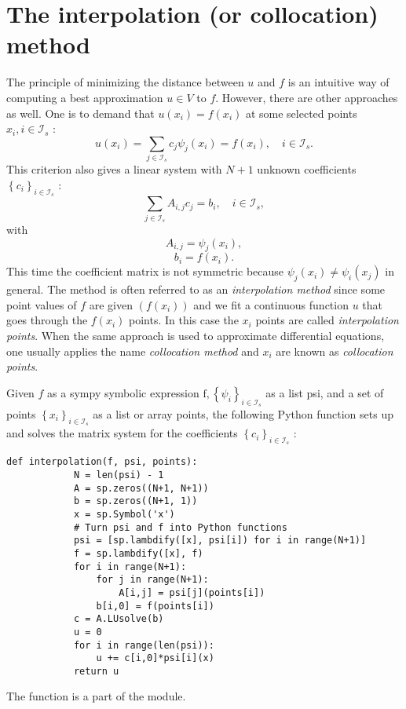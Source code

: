 \documentclass[../main.tex]{subfiles}
\begin{document}
	\section[The interpolation (or collocation) method]{The interpolation (or collocation) method}
	\label{sec:sec_2_10}
	The principle of minimizing the distance between $u$ and $f$ is an intuitive way of computing a best approximation $u \in V$ to $f$. However, there are other approaches as well. One is to demand that $u\left(x_{i}\right)=f\left(x_{i}\right)$ at some selected points $x_{i}, i \in \mathcal{I}_{s}$ :
	\begin{equation}\label{eqa42}
		u\left(x_{i}\right)=\sum_{j \in \mathcal{I}_{s}} c_{j} \psi_{j}\left(x_{i}\right)=f\left(x_{i}\right), \quad i \in \mathcal{I}_{s}.
	\end{equation}
	This criterion also gives a linear system with $N+1$ unknown coefficients
	$\left\{c_{i}\right\}_{i \in \mathcal{I}_{s}}$ :
	\begin{equation}\label{eqa43}
		\sum_{j \in \mathcal{I}_{s}} A_{i, j} c_{j}=b_{i}, \quad i \in \mathcal{I}_{s},
	\end{equation}
	with
	\begin{equation}\label{eqa44}
		A_{i, j} = \psi_{j}\left(x_{i}\right),
	\end{equation}
	\begin{equation}\label{eqa45}
		b_{i} = f\left(x_{i}\right).
	\end{equation}
	This time the coefficient matrix is not symmetric because $\psi_{j}\left(x_{i}\right) \neq \psi_{i}\left(x_{j}\right)$ in general. The method is often referred to as an \textit{interpolation method} since some point values of $f$ are given $\left(f\left(x_{i}\right)\right)$ and we fit a continuous function $u$ that goes through the $f\left(x_{i}\right)$ points. In this case the $x_{i}$ points are called \textit{interpolation points}. When the same approach is used to approximate differential equations, one usually applies the name \textit{collocation method} and $x_{i}$ are known as \textit{collocation points}.
	
	Given $f$ as a sympy symbolic expression $\mathrm{f},\left\{\psi_{i}\right\}_{i \in \mathcal{I}_{s}}$ as a list psi, and a set of points $\left\{x_{i}\right\}_{i \in \mathcal{I}_{s}}$ as a list or array points, the following Python function sets up and solves the matrix system for the coefficients $\left\{c_{i}\right\}_{i \in \mathcal{I}_{s}}$ :
	\begin{lstlisting}[numbers=none]
		def interpolation(f, psi, points):
			N = len(psi) - 1
			A = sp.zeros((N+1, N+1))
			b = sp.zeros((N+1, 1))
			x = sp.Symbol('x')
			# Turn psi and f into Python functions
			psi = [sp.lambdify([x], psi[i]) for i in range(N+1)]
			f = sp.lambdify([x], f)
			for i in range(N+1):
				for j in range(N+1):
					A[i,j] = psi[j](points[i])
				b[i,0] = f(points[i])
			c = A.LUsolve(b)
			u = 0
			for i in range(len(psi)):
				u += c[i,0]*psi[i](x)
			return u	
	\end{lstlisting}	
	The  function is a part of the  module.
	
\end{document}
